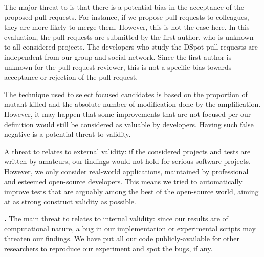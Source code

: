 \documentclass[table,xcdraw,smallextended]{svjour3}
\newcommand{\rev}[2]{\textcolor{blue}{#2}\GenericWarning{}{LaTeX Warning: Rev#1: #2}}\newcommand\REV\rev
\newcommand{\dspot}{DSpot\xspace}
\begin{document}
\textbf{\rqpullrequest{}}
The major threat to \rqpullrequest{} is that there is a potential bias in the acceptance of the proposed pull requests.
For instance, if we propose pull requests to colleagues, they are more likely to merge them.
However, this is not the case here.
In this evaluation, the pull requests are submitted by the first author, who is unknown to all considered projects. 
The developers who study the \dspot pull requests are independent from our group and social network.
Since the first author is unknown for the pull request reviewer, this is not a specific bias towards acceptance or rejection of the pull request.

\textbf{\rqcandidates{}}
The technique used to select focused candidates is based on the proportion of mutant killed and the absolute number of modification done by  the amplification. However, it may happen that some improvements that are not focused per our definition would still be considered as valuable by developers. Having such false negative is a potential threat to validity.

\textbf{\rqeffectiveness{}}
A threat to \rqeffectiveness{} relates to external validity: if the considered projects and tests are written by amateurs, our findings would not hold for serious software projects.
However, we only consider real-world applications, maintained by professional and esteemed open-source developers. This means we tried to automatically improve tests that are arguably among the best of the open-source world, aiming at as strong construct validity as possible.

\textbf{\rqAmplVersusIAmpl{}.}
The main threat to \rqAmplVersusIAmpl{} relates to internal validity: since our results are of computational nature, a bug in our implementation or experimental scripts may threaten our findings. We have put all our code publicly-available for other researchers to reproduce our experiment and spot the bugs, if any.
\end{document}
